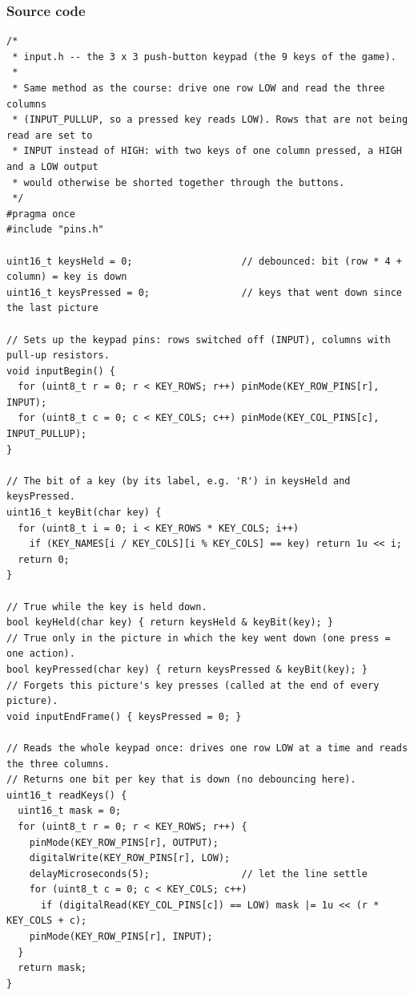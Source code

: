 \documentclass[11pt,a4paper]{article}
\begin{document}
\subsubsection*{Source code}
\begin{lstlisting}[language=Arduino]
/*
 * input.h -- the 3 x 3 push-button keypad (the 9 keys of the game).
 *
 * Same method as the course: drive one row LOW and read the three columns
 * (INPUT_PULLUP, so a pressed key reads LOW). Rows that are not being read are set to
 * INPUT instead of HIGH: with two keys of one column pressed, a HIGH and a LOW output
 * would otherwise be shorted together through the buttons.
 */
#pragma once
#include "pins.h"

uint16_t keysHeld = 0;                   // debounced: bit (row * 4 + column) = key is down
uint16_t keysPressed = 0;                // keys that went down since the last picture

// Sets up the keypad pins: rows switched off (INPUT), columns with pull-up resistors.
void inputBegin() {
  for (uint8_t r = 0; r < KEY_ROWS; r++) pinMode(KEY_ROW_PINS[r], INPUT);
  for (uint8_t c = 0; c < KEY_COLS; c++) pinMode(KEY_COL_PINS[c], INPUT_PULLUP);
}

// The bit of a key (by its label, e.g. 'R') in keysHeld and keysPressed.
uint16_t keyBit(char key) {
  for (uint8_t i = 0; i < KEY_ROWS * KEY_COLS; i++)
    if (KEY_NAMES[i / KEY_COLS][i % KEY_COLS] == key) return 1u << i;
  return 0;
}

// True while the key is held down.
bool keyHeld(char key) { return keysHeld & keyBit(key); }
// True only in the picture in which the key went down (one press = one action).
bool keyPressed(char key) { return keysPressed & keyBit(key); }
// Forgets this picture's key presses (called at the end of every picture).
void inputEndFrame() { keysPressed = 0; }

// Reads the whole keypad once: drives one row LOW at a time and reads the three columns.
// Returns one bit per key that is down (no debouncing here).
uint16_t readKeys() {
  uint16_t mask = 0;
  for (uint8_t r = 0; r < KEY_ROWS; r++) {
    pinMode(KEY_ROW_PINS[r], OUTPUT);
    digitalWrite(KEY_ROW_PINS[r], LOW);
    delayMicroseconds(5);                // let the line settle
    for (uint8_t c = 0; c < KEY_COLS; c++)
      if (digitalRead(KEY_COL_PINS[c]) == LOW) mask |= 1u << (r * KEY_COLS + c);
    pinMode(KEY_ROW_PINS[r], INPUT);
  }
  return mask;
}


\end{lstlisting}
\end{document}
